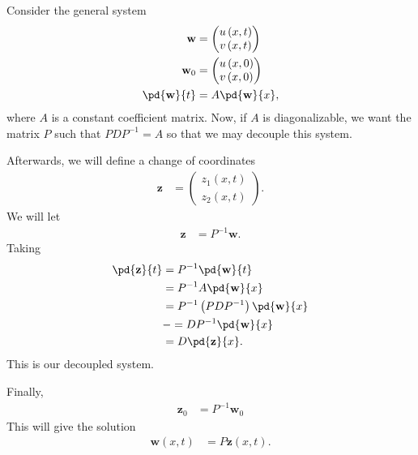 \documentclass[10pt]{mypackage}
\begin{document}
\begin{example}
  Consider the general system
  \begin{align*}
    \mathbf{w} &= \begin{pmatrix}u\left( x,t \right)\\ v\left( x,t \right)\end{pmatrix}\\
    \mathbf{w}_0 &= \begin{pmatrix}u\left( x,0 \right)\\ v\left( x,0 \right)\end{pmatrix}\\
    \pd{\mathbf{w}}{t} &= A \pd{\mathbf{w}}{x},
  \end{align*}
  where $A$ is a constant coefficient matrix. Now, if $A$ is diagonalizable, we want the matrix $P$ such that $PDP^{-1} = A$ so that we may decouple this system.\newline

  Afterwards, we will define a change of coordinates
  \begin{align*}
    \mathbf{z} &= \begin{pmatrix}z_1\left( x,t \right) \\ z_2\left( x,t \right)\end{pmatrix}.
  \end{align*}
  We will let
  \begin{align*}
    \mathbf{z} &= P^{-1}\mathbf{w}.
  \end{align*}
  Taking
  \begin{align*}
    \pd{\mathbf{z}}{t} &= P^{-1} \pd{\mathbf{w}}{t}\\
                       &= P^{-1}A \pd{\mathbf{w}}{x}\\
                       &= P^{-1}\left( PDP^{-1} \right) \pd{\mathbf{w}}{x}\\
                       &-= DP^{-1} \pd{\mathbf{w}}{x}\\
                       &= D \pd{\mathbf{z}}{x}.
  \end{align*}
  This is our decoupled system.\newline

  Finally,
  \begin{align*}
    \mathbf{z}_0 &= P^{-1} \mathbf{w}_0
  \end{align*}
  This will give the solution
  \begin{align*}
    \mathbf{w}\left( x,t \right) &= P \mathbf{z}\left( x,t \right).
  \end{align*}
  
\end{example}
\end{document}
